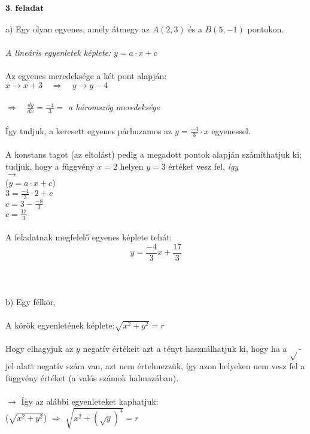 \documentclass[a4paper,12pt]{article}
\begin{document}
\pagebreak
\underline{\textit{$\textbf{3. feladat} $}}
\\
\\ a) Egy olyan egyenes, amely átmegy az $A(2,3)$ és a $B(5,-1)$ pontokon.
\\
\\ \indent\textit{A lineáris egyenletek képlete:} $y = a \cdot x + c$
\\
\\ Az egyenes meredeksége a két pont alapján:
\\ $x \rightarrow x+3 \quad \Rightarrow \quad y \rightarrow y-4$
\\
\\ $\Rightarrow \quad \frac{dy}{dx} = \frac{-4}{3} =$ \textit{a háromszög meredeksége}
\\
\\ Így tudjuk, a keresett egyenes párhuzamos az $y = \frac{-4}{3} \cdot x$ egyenessel.
\\
\\ A konstans tagot (az eltolást) pedig a megadott pontok alapján számíthatjuk ki;
\\ \indent tudjuk, hogy a függvény $x=2$ helyen $y=3$ értéket vesz fel, \textit{így}
\\ \indent $\rightarrow$
\\ \indent \indent ($y = a \cdot x+c$)
\\ \indent \indent $3 = \frac{-4}{3} \cdot 2 + c$
\\ \indent \indent $c = 3 - \frac{-8}{3}$
\\ \indent \indent $c = \frac{17}{3}$
\\
\\ A feladatnak megfelelő egyenes képlete tehát:
\\ $$y = \frac{-4}{3}x + \frac{17}{3}$$
\\
\\
\\ b) Egy félkör.
\\
\\ A körök egyenletének képlete:\quad $\sqrt{x^2 + y^2} = r$
\\
\\ \indent Hogy elhagyjuk az $y$ negatív értékeit azt a tényt használhatjuk ki, hogy ha a $\sqrt{ }$-jel alatt negatív szám van, azt nem értelmezzük, így azon helyeken nem vesz fel a függvény értéket (a valós számok halmazában).
\\
\\ $\rightarrow$ Így az alábbi egyenleteket kaphatjuk:
\\ \indent ($\sqrt{x^2 + y^2}$) $\Rightarrow$ $\sqrt{x^2 + \left(\sqrt{y}\right)^4} = r$
\end{document}
